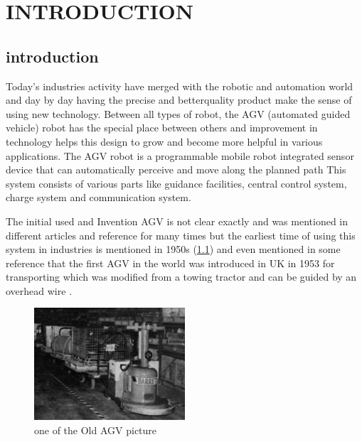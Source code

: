 \documentclass[main]{subfiles}
\begin{document}
\centering
\tableofcontents
\newpage

\listoffigures
\newpage

\listoftables
\newpage
\justifying
\part{INTRODUCTION}
\chapter{introduction}

Today’s industries activity have merged
with the robotic and automation world and
day by day having the precise and betterquality
product make the sense of using
new technology. Between all types of
robot, the AGV (automated guided
vehicle) robot has the special place
between others and improvement in
technology helps this design to grow and
become more helpful in various
applications. The AGV robot is a
programmable mobile robot integrated
sensor device that can automatically
perceive and move along the planned
path\cite{das2016design} This system consists of various
parts like guidance facilities, central
control system, charge system and
communication system\cite{moshayedi2019agv}. 

The initial used and Invention AGV is not clear exactly and
was mentioned in different articles and
reference for many times but the earliest
time of using this system in industries is
mentioned in 1950s \cite{reveliotis2000conflict}
(\cref{oldAgv}) and even
mentioned in some reference that the first
AGV in the world was introduced in UK in
1953 for transporting which was modified
from a towing tractor and can be guided by
an overhead wire \cite{moshayedi2019agv}.

\begin{figure}[H]
    \centering
\includegraphics[width=0.5\textwidth]{doc/oldestAGV.jpg}
\caption{one of the Old AGV picture}
\label{oldAgv} %
\end{figure}
\end{document}
